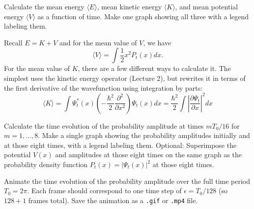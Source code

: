 \begin{solution}
\end{solution}

\begin{problem}[10]
  Calculate the mean energy $\langle E \rangle$, mean kinetic energy $\langle K \rangle$, and mean potential energy $\langle V \rangle$ as a function of time.
  Make one graph showing all three with a legend labeling them.

  \begin{hint}
    Recall $E = K + V$ and for the mean value of $V$, we have
    \begin{equation}
      \langle V\rangle = \int \frac{1}{2}x^2 P_t(x) dx.
    \end{equation}
    For the mean value of $K$, there are a few different ways to calculate it.
    The simplest uses the kinetic energy operator (Lecture 2), but rewrites it in terms of the first derivative of the wavefunction using integration by parts:
    \begin{equation}
      \langle K\rangle = \int \Psi_t^\ast(x) \left(- \frac{\hbar^2}{2} \frac{\partial^2}{\partial x^2}\right) \Psi_t(x) dx = \frac{\hbar^2}{2} \int \left|\frac{\partial\Psi_t}{\partial x}\right|^2  dx
    \end{equation}
  \end{hint}
\end{problem}

\begin{solution}
\end{solution}

\begin{problem}[10]
  Calculate the time evolution of the probability amplitude at times $mT_0/16$ for $m=1, \dots, 8$.
  Make a single graph showing the probability amplitudes initially and at those eight times, with a legend labeling them.
  Optional: Superimpose the potential $V(x)$ and amplitudes at those eight times on the same graph as the probability density function $P_t(x) = |\Psi_t(x)|^2$ at those eight times.
\end{problem}

\begin{solution}
\end{solution}

\begin{problem}[10]
  Animate the time evolution of the probability amplitude over the full time period $T_0 = 2\pi$.
  Each frame should correspond to one time step of $\epsilon = T_0/128$ (so $128+1$ frames total).
  Save the animation as a \texttt{.gif} or \texttt{.mp4} file.
\end{problem}

